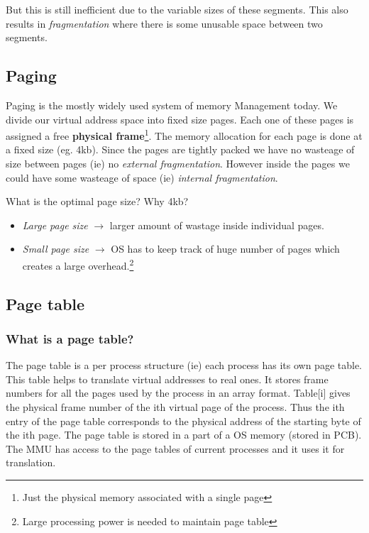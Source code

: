 \documentclass[12pt]{article}
\newcommand{\tbox}[1]{\noindent\fbox{\parbox{\textwidth}{#1}}}
\begin{document}
But this is still inefficient due to the variable sizes of these segments. This also results in \textit{fragmentation} where there is some unusable space between two segments. 

\subsection{Paging}
Paging is the mostly widely used system of memory Management today. We divide our virtual address space into fixed size pages. Each one of these pages is assigned a free \textbf{physical frame}\footnote{Just the physical memory associated with a single page}.
The memory allocation for each page is done at a fixed size (eg. 4kb). Since the pages are tightly packed we have no wasteage of size between pages (ie) no \textit{external fragmentation}. However inside the pages we could have some wasteage of space (ie) \textit{internal fragmentation}.

What is the optimal page size? Why 4kb?
\begin{itemize}[topsep=0pt, partopsep=0pt, itemsep=0pt, parsep=0pt]
    \item \textit{Large page size} \(\rightarrow\) larger amount of wastage inside individual pages.
    \item \textit{Small page size} \(\rightarrow\) OS has to keep track of huge number of pages which creates a large overhead.\footnote{Large processing power is needed to maintain page table}
\end{itemize}
\noindent\tbox{
    \begin{center}
    \textbf{\Huge Lecture 13}
    \end{center}
}
\subsection{Page table}
\subsubsection*{What is a page table?}
The page table is a per process structure (ie) each process has its own page table. This table helps to translate
virtual addresses to real ones. It stores frame numbers for all the pages used by the process in an array format. 
Table[i] gives the physical frame number of the ith virtual page of the process. Thus the ith entry of the page table corresponds to the physical address of the starting byte of the ith page. The page table is stored in a part of a OS memory (stored in PCB). The MMU has 
access to the page tables of current processes and it uses it for translation. 
\end{document}
